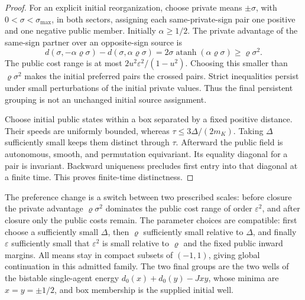 \begin{proof}
For an explicit initial reorganization, choose private means $\pm\sigma$, with $0<\sigma<\sigma_{\max}$, in both sectors, assigning each same-private-sign pair one positive and one negative public member. Initially $\alpha\geq1/2$. The private advantage of the same-sign partner over an opposite-sign source is
\begin{equation}
 d(\sigma,-\alpha\varrho\sigma)
 -d(\sigma,\alpha\varrho\sigma)
 =2\sigma\operatorname{atanh}(\alpha\varrho\sigma)
 \geq\varrho\sigma^2.
 \label{erase:crossed-pair-gap}
\end{equation}
The public cost range is at most $2u^2\varepsilon^2/(1-u^2)$. Choosing this smaller than $\varrho\sigma^2$ makes the initial preferred pairs the crossed pairs. Strict inequalities persist under small perturbations of the initial private values. Thus the final persistent grouping is not an unchanged initial source assignment.

Choose initial public states within a box separated by a fixed positive distance. Their speeds are uniformly bounded, whereas $\tau\leq3\Delta/(2m_K)$. Taking $\Delta$ sufficiently small keeps them distinct through $\tau$. Afterward the public field is autonomous, smooth, and permutation equivariant. Its equality diagonal for a pair is invariant. Backward uniqueness precludes first entry into that diagonal at a finite time. This proves finite-time distinctness.
\end{proof}

The preference change is a switch between two prescribed scales: before closure the private advantage $\varrho\sigma^2$ dominates the public cost range of order $\varepsilon^2$, and after closure only the public costs remain. The parameter choices are compatible: first choose a sufficiently small $\Delta$, then $\varrho$ sufficiently small relative to $\Delta$, and finally $\varepsilon$ sufficiently small that $\varepsilon^2$ is small relative to $\varrho$ and the fixed public inward margins. All means stay in compact subsets of $(-1,1)$, giving global continuation in this admitted family. The two final groups are the two wells of the bistable single-agent energy $d_0(x)+d_0(y)-Jxy$, whose minima are $x=y=\pm1/2$, and box membership is the supplied initial well.


